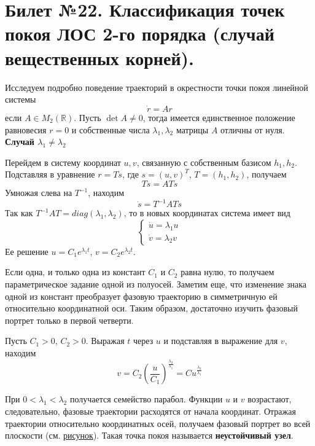 \documentclass{article}
\begin{document}
\section{Билет №22. Классификация точек покоя ЛОС 2-го порядка (случай вещественных корней).}
Исследуем подробно поведение траекторий в окрестности точки покоя линейной системы
\begin{equation*}
    \dot{r} = Ar
\end{equation*}
если $A \in M_2(\mathbb{R})$. Пусть $\det A \neq 0$, тогда имеется единственное положение равновесия $r = 0$ и собственные числа $\lambda_1, \lambda_2$ матрицы $A$ отличны от нуля.\\

\noindent \textbf{Случай $\lambda_1 \neq \lambda_2$}

Перейдем в систему координат $u, v$, связанную с собственным базисом $h_1, h_2$. Подставляя в уравнение $r = Ts$, где $s = (u, v)^T$, $T = (h_1, h_2)$, получаем
\begin{equation*}
    T\dot{s} = ATs
\end{equation*}
Умножая слева на $T^{-1}$, находим
\begin{equation*}
    \dot{s} = T^{-1}ATs
\end{equation*}
Так как $T^{-1}AT = diag(\lambda_1, \lambda_2)$, то в новых координатах система имеет вид
\begin{equation*}
    \begin{cases}
    \dot{u} = \lambda_1 u\\
    \dot{v} = \lambda_2 v
    \end{cases}
\end{equation*}
Ее решение $u = C_1e^{\lambda_1 t}$, $v = C_2e^{\lambda_2 t}$.

Если одна, и только одна из констант $C_1$ и $C_2$ равна нулю, то получаем параметрическое задание одной из полуосей. Заметим еще, что изменение знака одной из констант преобразует фазовую траекторию в симметричную ей относительно координатной оси. Таким образом, достаточно изучить фазовый портрет только в первой четверти.

Пусть $C_1 > 0$, $C_2 > 0$. Выражая $t$ через $u$ и подставляя в выражение для $v$, находим
\begin{equation*}
    v = C_2\left(\frac{u}{C_1} \right)^{\frac{\lambda_2}{\lambda_1}} = Cu^{\frac{\lambda_2}{\lambda_1}}
\end{equation*}

При $0 < \lambda_1 < \lambda_2$ получается семейство парабол. Функции $u$ и $v$ возрастают, следовательно, фазовые траектории расходятся от начала координат. Отражая траектории относительно координатных осей, получаем фазовый портрет во всей плоскости (см. \hyperref[neustuzel]{рисунок}). Такая точка покоя называется \textbf{неустойчивый узел}.
\end{document}
